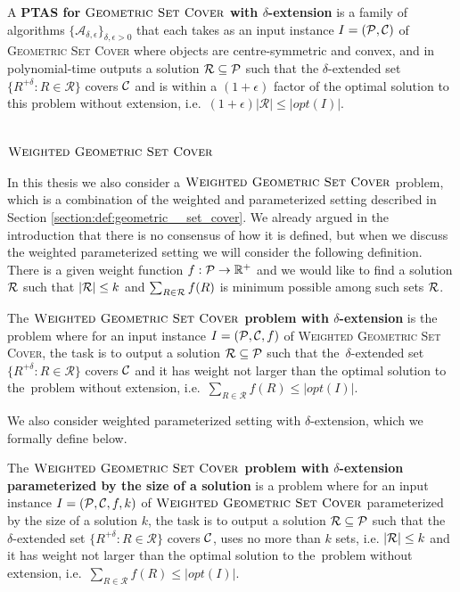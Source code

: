 \begin{defi}
A \textbf{PTAS for $\textsc{Geometric Set Cover}$
with $\delta$-extension} is a family of algorithms
$\{\mathcal{A}_{\delta, \epsilon}\}_{\delta, \epsilon > 0}$ that
each takes as an input instance $I=(\mathcal{P}, \mathcal{C})$
of \textsc{Geometric Set} \textsc{Cover} where objects are centre-symmetric and convex,
and in polynomial-time outputs a solution $\mathcal{R} \subseteq \mathcal{P}$
such that the $\delta$-extended set
$\{ R^{+\delta} :  R \in \mathcal{R} \}$ covers $\mathcal{C}$
and is within a $(1+\epsilon)$ factor of the optimal
solution to this problem without
extension, i.e.~$(1+\epsilon)|\mathcal{R}| \le |opt(I)|$.
\end{defi}

\section{$\textsc{Weighted Geometric Set Cover}$}

In this thesis we also consider a $\textsc{Weighted Geometric Set Cover}$ problem,
which is a combination
of the weighted and parameterized setting described in 
Section \ref{section:def:geometric__set_cover}.
We already argued in the introduction
that there is no consensus of how it is defined, but when we discuss the
weighted parameterized setting we will consider the following
definition. There is a given weight function
$f : \mathcal{P} \rightarrow \mathbb{R^+}$
and we would like to find a solution $\mathcal{R}$
such that $|\mathcal{R}| \le k$
and $\sum_{R \in \mathcal{R}} f(R)$ is minimum possible among such sets $\mathcal{R}$.

\begin{defi}
The \textbf{$\textsc{Weighted Geometric Set Cover}$ problem
with $\delta$-extension} is the problem where for an input instance
$I=(\mathcal{P}, \mathcal{C}, f)$ of \textsc{Weighted Geometric Set} \textsc{Cover},
the task is to output a solution $\mathcal{R} \subseteq \mathcal{P}$
such that the~$\delta$-extended set
$\{ R^{+\delta} :  R \in \mathcal{R} \}$ covers $\mathcal{C}$
and it has weight not larger than the optimal solution to the~problem without
extension, i.e.~$\sum_{R \in \mathcal{R}} f(R) \le |opt(I)|$.
\end{defi}

We also consider weighted parameterized setting with $\delta$-extension,
which we formally define below.

\begin{defi}
The \textbf{$\textsc{Weighted Geometric Set Cover}$ problem
with $\delta$-extension parameterized by the size of a solution}
is a problem where for an input instance
${I=(\mathcal{P}, \mathcal{C}, f, k)}$ of $\textsc{Weighted Geometric Set Cover}$
parameterized by the size of a solution $k$,
the task is to output a solution $\mathcal{R} \subseteq \mathcal{P}$
such that the~$\delta$-extended set
$\{ R^{+\delta} :  R \in \mathcal{R} \}$ covers $\mathcal{C}$,
uses no more than $k$ sets, i.e. $|\mathcal{R}| \le k$
and it has weight not larger than the optimal solution to the~problem without
extension, i.e.~$\sum_{R \in \mathcal{R}} f(R) \le |opt(I)|$.
\end{defi}
